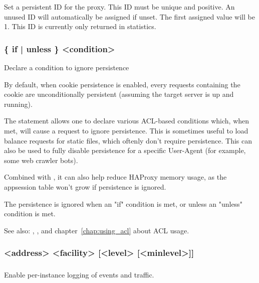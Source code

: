   Set a persistent ID for the proxy. This ID must be unique and positive.
  An unused ID will automatically be assigned if unset. The first assigned
  value will be 1. This ID is currently only returned in statistics.

\subsubsection[ignore-persist]{ \{ if | unless \} <condition>}

  Declare a condition to ignore persistence


  By default, when cookie persistence is enabled, every requests containing
  the cookie are unconditionally persistent (assuming the target server is up
  and running).

  The  statement allows one to declare various ACL-based
  conditions which, when met, will cause a request to ignore persistence.
  This is sometimes useful to load balance requests for static files, which
  oftenly don't require persistence. This can also be used to fully disable
  persistence for a specific User-Agent (for example, some web crawler bots).

  Combined with , it can also help reduce HAProxy memory usage, as
  the appsession table won't grow if persistence is ignored.

  The persistence is ignored when an "if" condition is met, or unless an
  "unless" condition is met.


See also: , , and chapter~\ref{chap:using_acl} about ACL usage.

\subsubsection[log global]{}
\subsubsection[log]{ <address> <facility> [<level> [<minlevel>]]}
\subsubsection[no log]{}


  Enable per-instance logging of events and traffic.
  
